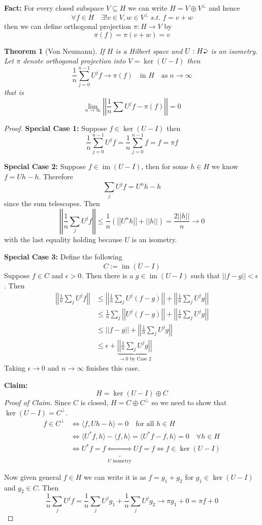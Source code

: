 \documentclass[11pt]{article}
\newcommand{\defeq}{:=}
\newcommand{\norm}[1]{\left|\left|#1\right|\right|}
\DeclareMathOperator{\im}{\mathrm{im}}
\newcommand{\toitself}{\mathbin{\scalebox{.85}{%
    \lefteqn{\scalebox{.5}{$\blacktriangleleft$}}\raisebox{.34ex}{$\supset$}}}}
\newcommand{\mdf}[1]{{\color{RoyalBlue} #1}}
\newtheorem{theorem}[prop]{Theorem}
\begin{document}
\textbf{Fact: }
For every closed subspace $V\subseteq H$ we can write $H=V \oplus V^\perp$ and hence
\[
\forall f\in H \quad \exists ! v\in V, w\in V^\perp \; s.t. \; f= v+ w
\]
then we can define \mdf{orthogonal projection} $\pi: H \to V$ by
\[
	\pi(f) = \pi (v+ w) = v
\]

\begin{theorem}[Von Neumann]
If $H$ is a Hilbert space and $U:H\toitself$ is an isometry.
Let $\pi$ denote orthogonal projection into $V=\ker(U-I)$ then
\[
	\frac{1}{n}\sum_{j=0}^{n-1}U^j f \to \pi (f) \quad \text{in }H \quad \text{as} \; n\to \infty
\]
that is
\[
\lim_{n\to\infty}\norm{\frac{1}{n}\sum U^j f - \pi(f)} = 0
\]
\end{theorem}

\begin{proof}
\textbf{Special Case 1: }Suppose $f\in\ker(U-I)$ then
\[
	\frac{1}{n}\sum_{j=0}^{n-1}U^j f = \frac{1}{n}\sum_{j=0}^{n-1}f=f=\pi f
\]

\textbf{Special Case 2: }Suppose $f\in\im(U-I)$, then for some $h\in H$ we know $f= Uh - h$.
Therefore
\[
	\sum_{j}U^j f = U^n h - h
\]
since the sum telescopes.
Then
\[
	\norm{\frac{1}{n}\sum_{j}U^j f} \leq \frac{1}{n}\left( \norm{U^n h} + \norm {h}\right) = \frac{2\norm{h}}{n} \to 0
\]
with the last equality holding because $U$ is an isometry.

\textbf{Special Case 3: }Define the following
\[
	C\defeq \overline{\im(U-I)}
\]
Suppose $f\in C$ and $\epsilon > 0$.
Then there is a $g\in\im(U-I)$ such that $\norm{f-g} < \epsilon$.
Then
\begin{align*}
	\norm{\frac{1}{n}\sum_{j}U^j f } &\leq \norm{\frac{1}{n}\sum_{j}U^j(f-g)} + \norm{\frac{1}{n}\sum_{j}U^j g} \\
									 &\leq \frac{1}{n}\sum_{j}\norm{U^j(f-g)} + \norm{\frac{1}{n}\sum_{j}U^j g} \\
									 &\leq \norm{f-g} + \norm{\frac{1}{n}\sum_{j}U^j g} \\
									 &\leq \epsilon + \underbrace{\norm{\frac{1}{n}\sum_{j}U^j g}}_{\to 0 \text{ by Case 2}}
\end{align*}
Taking $\epsilon\to 0$ and $n\to\infty$ finishes this case.

\textbf{Claim: }
\[
	H = \ker(U-I) \oplus C
\]
\textit{Proof of Claim.} Since $C$ is closed, $H= C \oplus C^\perp$ so we need to show that $\ker(U-I)=C^\perp$.
\begin{align*}
	f \in C^\perp & \iff \langle f, Uh - h\rangle=0 \quad \text{for all }h\in H \\
				  & \iff \langle U^\ast f, h\rangle - \langle f, h\rangle = \langle U^\ast f -f, h\rangle= 0 \quad\forall h \in H \\
				  & \iff U^\ast f = f \underbrace{\iff}_{U \text{ isometry}} Uf = f \iff f \in\ker(U-I)
\end{align*}

Now given general $f\in H$ we can write it is as $f=g_1 + g_2$ for $g_1\in\ker(U-I)$ and $g_2\in C$.
Then
\[
	\frac{1}{n}\sum_{j}U^j f = \frac{1}{n}\sum_{j}U^j g_1 + \frac{1}{n}\sum_{j}U^j g_2 \to \pi g_1 + 0 = \pi f + 0
\]
\end{proof}
\end{document}
